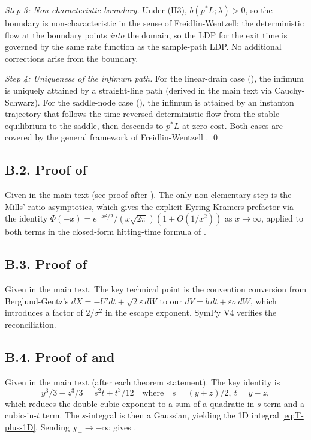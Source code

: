 \documentclass[11pt,a4paper]{article}
\theoremstyle{plain}
\theoremstyle{definition}
\newcommand{\eps}{\varepsilon}
\begin{document}
\emph{Step 3: Non-characteristic boundary.} Under (H3), $b(p^*L;\lambda) > 0$, so the boundary is non-characteristic in the sense of Freidlin-Wentzell: the deterministic flow at the boundary points \emph{into} the domain, so the LDP for the exit time is governed by the same rate function as the sample-path LDP. No additional corrections arise from the boundary.

\emph{Step 4: Uniqueness of the infimum path.} For the linear-drain case (), the infimum is uniquely attained by a straight-line path (derived in the main text via Cauchy-Schwarz). For the saddle-node case (), the infimum is attained by an instanton trajectory that follows the time-reversed deterministic flow from the stable equilibrium to the saddle, then descends to $p^*L$ at zero cost. Both cases are covered by the general framework of Freidlin-Wentzell \cite[Chapter 4 \S 2 Theorem 2.1]{FreidlinWentzell2012}.
\qed

\subsection*{B.2. Proof of }

Given in the main text (see proof after ). The only non-elementary step is the Mills' ratio asymptotics, which gives the explicit Eyring-Kramers prefactor via the identity $\Phi(-x) = e^{-x^2/2}/(x\sqrt{2\pi})(1 + O(1/x^2))$ as $x \to \infty$, applied to both terms in the closed-form hitting-time formula of \cite[\S 2.5.2]{KaratzasShreve1991}.

\subsection*{B.3. Proof of }

Given in the main text. The key technical point is the convention conversion from Berglund-Gentz's $dX = -U'dt + \sqrt{2}\eps\,dW$ to our $dV = b\,dt + \eps\sigma\,dW$, which introduces a factor of $2/\sigma^2$ in the escape exponent. SymPy V4 verifies the reconciliation.

\subsection*{B.4. Proof of  and }

Given in the main text (after each theorem statement). The key identity is
$$y^3/3 - z^3/3 = s^2 t + t^3/12\quad\text{where}\quad s = (y+z)/2,\ t = y-z,$$
which reduces the double-cubic exponent to a sum of a quadratic-in-$s$ term and a cubic-in-$t$ term. The $s$-integral is then a Gaussian, yielding the 1D integral \eqref{eq:T-plus-1D}. Sending $\chi_+ \to -\infty$ gives .
\end{document}
